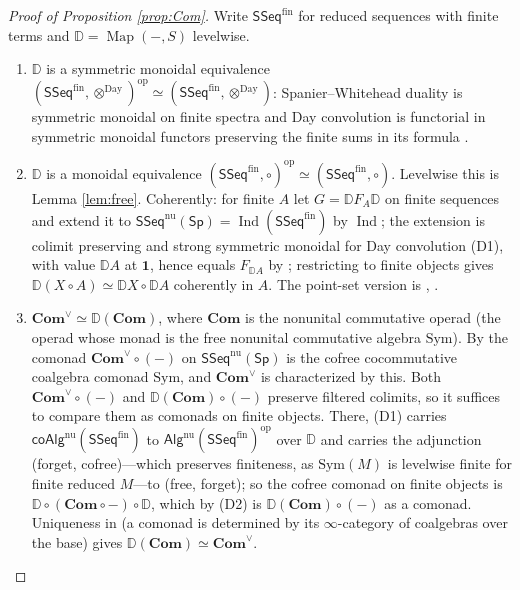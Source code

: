 \documentclass[11pt]{amsart}
\theoremstyle{definition}
\theoremstyle{remark}
\newcommand{\Sp}{\mathsf{Sp}}
\newcommand{\Map}{\operatorname{Map}}
\newcommand{\SSeq}{\mathsf{SSeq}}
\newcommand{\Alg}{\mathsf{Alg}}
\newcommand{\coAlg}{\mathsf{coAlg}}
\newcommand{\Com}{\mathbf{Com}}
\newcommand{\Comv}{\mathbf{Com}^{\vee}}
\newcommand{\dual}{\mathbb{D}}
\newcommand{\unit}{\mathbf{1}}
\newcommand{\Ind}{\operatorname{Ind}}
\begin{document}
\begin{proof}[Proof of Proposition \ref{prop:Com}]
Write $\SSeq^{\mathrm{fin}}$ for reduced sequences with finite terms and $\dual=\Map(-,S)$ levelwise.
\begin{enumerate}[label=(D\arabic*),leftmargin=2.6em]
\item $\dual$ is a symmetric monoidal equivalence $(\SSeq^{\mathrm{fin}},\otimes^{\mathrm{Day}})^{\mathrm{op}}\simeq(\SSeq^{\mathrm{fin}},\otimes^{\mathrm{Day}})$: Spanier--Whitehead duality is symmetric monoidal on finite spectra \cite[4.6.1]{HA} and Day convolution is functorial in symmetric monoidal functors preserving the finite sums in its formula \cite[2.2.6]{HA}.
\item $\dual$ is a monoidal equivalence $(\SSeq^{\mathrm{fin}},\circ)^{\mathrm{op}}\simeq(\SSeq^{\mathrm{fin}},\circ)$. Levelwise this is Lemma \ref{lem:free}. Coherently: for finite $A$ let $G=\dual F_A\dual$ on finite sequences and extend it to $\SSeq^{\mathrm{nu}}(\Sp)=\Ind(\SSeq^{\mathrm{fin}})$ by $\Ind$; the extension is colimit preserving and strong symmetric monoidal for Day convolution (D1), with value $\dual A$ at $\unit$, hence equals $F_{\dual A}$ by \cite[Remark 2.7]{BH}; restricting to finite objects gives $\dual(X\circ A)\simeq\dual X\circ\dual A$ coherently in $A$. The point-set version is \cite[Proposition 6.4]{Ch05}, \cite[Remark 1.9]{Ch12}.
\item $\Comv\simeq\dual(\Com)$, where $\Com$ is the nonunital commutative operad (the operad whose monad is the free nonunital commutative algebra $\mathrm{Sym}$). By \cite[Propositions 2.10, 2.11]{BH} the comonad $\Comv\circ(-)$ on $\SSeq^{\mathrm{nu}}(\Sp)$ is the cofree cocommutative coalgebra comonad $\mathrm{Sym}$, and $\Comv$ is characterized by this. Both $\Comv\circ(-)$ and $\dual(\Com)\circ(-)$ preserve filtered colimits, so it suffices to compare them as comonads on finite objects. There, (D1) carries $\coAlg^{\mathrm{nu}}(\SSeq^{\mathrm{fin}})$ to $\Alg^{\mathrm{nu}}(\SSeq^{\mathrm{fin}})^{\mathrm{op}}$ over $\dual$ and carries the adjunction (forget, cofree)---which preserves finiteness, as $\mathrm{Sym}(M)$ is levelwise finite for finite reduced $M$---to (free, forget); so the cofree comonad on finite objects is $\dual\circ(\Com\circ-)\circ\dual$, which by (D2) is $\dual(\Com)\circ(-)$ as a comonad. Uniqueness in \cite[Proposition 2.11]{BH} (a comonad is determined by its $\infty$-category of coalgebras over the base) gives $\dual(\Com)\simeq\Comv$.

\end{enumerate}
\end{proof}
\end{document}
